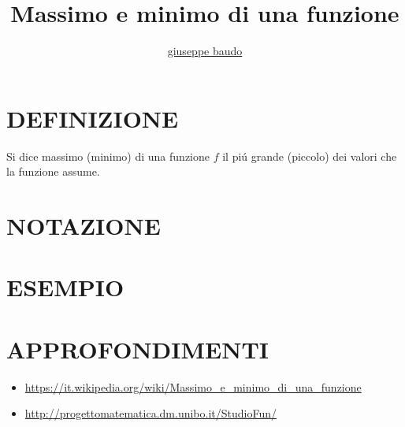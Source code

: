 \documentclass[a4paper,10pt]{article}
\title{Massimo e minimo di una funzione}
\author{\href{http://www.baudo.hol.es}{giuseppe baudo}}
\begin{document}
\maketitle

\section{DEFINIZIONE}
Si dice massimo (minimo) di una funzione $f$ il pi\'{u} grande (piccolo) dei valori che la funzione assume.
\section{NOTAZIONE}

\section{ESEMPIO}

\section{APPROFONDIMENTI}
\begin{itemize}
 \item \href{https://it.wikipedia.org/wiki/Massimo_e_minimo_di_una_funzione}{https://it.wikipedia.org/wiki/Massimo_e_minimo_di_una_funzione}
 \item \href{http://progettomatematica.dm.unibo.it/StudioFun/}{http://progettomatematica.dm.unibo.it/StudioFun/}
\end{itemize}
\end{document}
